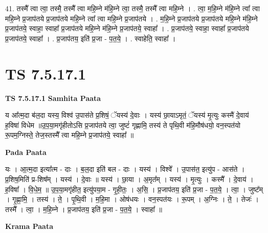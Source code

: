 \documentclass[17pt]{extarticle}
\begin{document}
41. तस्मै᳚ त्वा त्वा॒ तस्मै॒ तस्मै᳚ त्वा महि॒म्ने म॑हि॒म्ने त्वा॒ तस्मै॒ तस्मै᳚ त्वा महि॒म्ने । . त्वा॒ म॒हि॒म्ने म॑हि॒म्ने त्वा᳚ त्वा महि॒म्ने प्र॒जाप॑तये प्र॒जाप॑तये महि॒म्ने त्वा᳚ त्वा महि॒म्ने प्र॒जाप॑तये । . म॒हि॒म्ने प्र॒जाप॑तये प्र॒जाप॑तये महि॒म्ने म॑हि॒म्ने प्र॒जाप॑तये॒ स्वाहा॒ स्वाहा᳚ प्र॒जाप॑तये महि॒म्ने म॑हि॒म्ने प्र॒जाप॑तये॒ स्वाहा᳚ । . प्र॒जाप॑तये॒ स्वाहा॒ स्वाहा᳚ प्र॒जाप॑तये प्र॒जाप॑तये॒ स्वाहा᳚ । . प्र॒जाप॑तय॒ इति॑ प्र॒जा - प॒त॒ये॒ । . स्वाहेति॒ स्वाहा᳚ । \newline
\pagebreak
{}

\section{ TS 7.5.17.1 }

\textbf{TS 7.5.17.1 } \newline
\textbf{Samhita Paata} \newline

य आ᳚त्म॒दा ब॑ल॒दा यस्य॒ विश्व॑ उ॒पास॑ते प्र॒शिषं॒ ॅयस्य॑ दे॒वाः । यस्य॑ छा॒याऽमृतं॒ ॅयस्य॑ मृ॒त्युः कस्मै॑ दे॒वाय॑ ह॒विषा॑ विधेम ॥उ॒प॒या॒मगृ॑हीतोऽसि प्र॒जाप॑तये त्वा॒ जुष्टं॑ गृह्णामि॒ तस्य॑ ते पृथि॒वी म॑हि॒मौष॑धयो॒ वन॒स्पत॑यो रू॒पम॒ग्निस्ते॒ तेज॒स्तस्मै᳚ त्वा महि॒म्ने प्र॒जाप॑तये॒ स्वाहा᳚ ॥ \newline

\textbf{Pada Paata} \newline

यः । आ॒त्म॒दा इत्या᳚त्म - दाः । ब॒ल॒दा इति॑ बल - दाः । यस्य॑ । विश्वे᳚ । उ॒पास॑त॒ इत्यु॑प - आस॑ते । प्र॒शिष॒मिति॑ प्र-शिष᳚म् । यस्य॑ । दे॒वाः ॥ यस्य॑ । छा॒या । अ॒मृत᳚म् । यस्य॑ । मृ॒त्युः । कस्मै᳚ । दे॒वाय॑ । ह॒विषा᳚ । वि॒धे॒म॒ ॥ उ॒प॒या॒मगृ॑हीत॒ इत्यु॑पया॒म - गृ॒ही॒तः॒ । अ॒सि॒ । प्र॒जाप॑तय॒ इति॑ प्र॒जा - प॒त॒ये॒ । त्वा॒ । जुष्ट᳚म् । गृ॒ह्णा॒मि॒ । तस्य॑ । ते॒ । पृ॒थि॒वी । म॒हि॒मा । ओष॑धयः । वन॒स्पत॑यः । रू॒पम् । अ॒ग्निः । ते॒ । तेजः॑ । तस्मै᳚ । त्वा॒ । म॒हि॒म्ने । प्र॒जाप॑तय॒ इति॑ प्र॒जा - प॒त॒ये॒ । स्वाहा᳚ ॥  \newline


\textbf{Krama Paata} \newline
\end{document}
